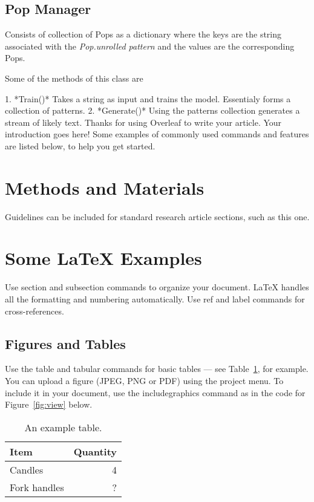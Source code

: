\documentclass[fleqn,10pt]{olplainarticle}
\begin{document}
\subsection{Pop Manager}
Consists of collection of Pops as a dictionary where the keys are the string associated with the \textit{Pop.unrolled pattern} and the values are the corresponding Pops.

Some of the methods of this class are 

1. *Train()* Takes a string as input and trains the model. Essentialy forms a collection of patterns.
2. *Generate()* Using the patterns collection generates a stream of likely text. 
Thanks for using Overleaf to write your article. Your introduction goes here! Some examples of commonly used commands and features are listed below, to help you get started.

\section*{Methods and Materials}

Guidelines can be included for standard research article sections, such as this one.

\section*{Some \LaTeX{} Examples}
\label{sec:examples}

Use section and subsection commands to organize your document. \LaTeX{} handles all the formatting and numbering automatically. Use ref and label commands for cross-references.

\subsection*{Figures and Tables}

Use the table and tabular commands for basic tables --- see Table~\ref{tab:widgets}, for example. You can upload a figure (JPEG, PNG or PDF) using the project menu. To include it in your document, use the includegraphics command as in the code for Figure~\ref{fig:view} below.



\begin{table}[ht]
\centering
\begin{tabular}{l|r}
Item & Quantity \\\hline
Candles & 4 \\
Fork handles & ?  
\end{tabular}
\caption{\label{tab:widgets}An example table.}
\end{table}
\end{document}
